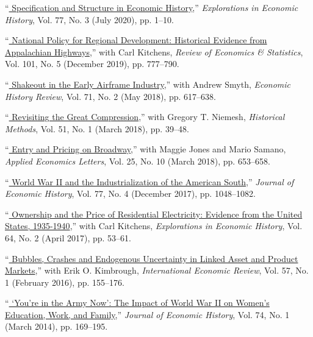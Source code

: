 \documentclass[11pt,letterpaper]{article}
\begin{document}
\begin{description}[leftmargin=0in,itemsep=.25em,itemindent=.15in]
\item 	``\href{https://doi.org/10.1016/j.eeh.2020.101343}{\color{black}
			Specification and Structure in Economic History},'' 
			\emph{Explorations in Economic History}, Vol. 77, No. 3 (July 2020), pp. 1--10.
\item 	``\href{https://doi.org/10.1162/rest_a_00808}{\color{black}
			National Policy for Regional Development: Historical Evidence from Appalachian Highways},'' 
			with Carl Kitchens, \emph{Review of Economics \& Statistics}, Vol. 101, No. 5 (December 2019), pp. 777--790.
\item 	``\href{https://doi.org/10.1111/ehr.12430}{\color{black}
			Shakeout in the Early Airframe Industry},'' 
			with Andrew Smyth, \emph{Economic History Review}, Vol. 71, No. 2 (May 2018), pp. 617--638.
\item 	``\href{https://doi.org/10.1080/01615440.2017.1393360}{\color{black}
			Revisiting the Great Compression},'' 
			with Gregory T. Niemesh, \emph{Historical Methods}, Vol. 51, No. 1 (March 2018), pp. 39--48.
\item 	``\href{https://doi.org/10.1080/13504851.2017.1355531}{\color{black}
			Entry and Pricing on Broadway},'' with Maggie Jones and Mario Samano, 
			\emph{Applied Economics Letters}, Vol. 25, No. 10 (March 2018), pp. 653--658.
\item 	``\href{https://doi.org/10.1017/S0022050717000791}{\color{black}
			World War II and the Industrialization of the American South},'' 
			\emph{Journal of Economic History}, Vol. 77, No. 4 (December 2017), pp. 1048--1082.
\item 	``\href{https://doi.org/10.1016/j.eeh.2016.05.002}{\color{black}
			Ownership and the Price of Residential Electricity: Evidence from the United States, 1935-1940},'' 
			with Carl Kitchens, \emph{Explorations in Economic History}, Vol. 64, No. 2 (April 2017), pp. 53--61.
\item 	``\href{https://doi.org/10.1111/iere.12151}{\color{black} 
			Bubbles, Crashes and Endogenous Uncertainty in Linked Asset and Product Markets},'' 
			with Erik O. Kimbrough, \emph{International Economic Review}, Vol. 57, No. 1 (February 2016), pp. 155--176.
\item 	``\href{https://doi.org/10.1017/S0022050714000060}{\color{black} 
			`You're in the Army Now': The Impact of World War II on Women's Education, Work, and Family},'' 
			\emph{Journal of Economic History}, Vol. 74, No. 1 (March 2014), pp. 169--195.		

\end{description}
\end{document}
